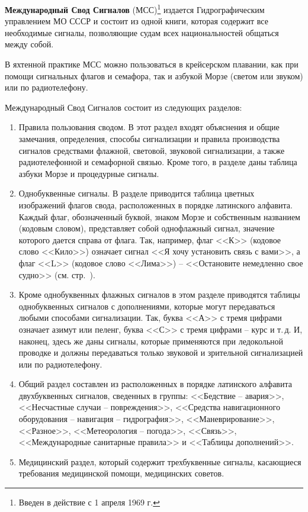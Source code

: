 \documentclass[a4paper, 12pt, twoside, final]{scrbook}
\begin{document}
\textbf{Международный Свод Сигналов} (МСС)\footnote{Введен в действие с 1 апреля 1969 г.} издается Гидрографическим управлением МО СССР и состоит из одной книги, которая содержит все необходимые сигналы, позволяющие судам всех национальностей общаться между собой.

        В яхтенной практике МСС можно пользоваться в крейсерском плавании, как при помощи сигнальных флагов и семафора, так и азбукой Морзе (светом или звуком) или по радиотелефону.

        Международный Свод Сигналов состоит из следующих разделов:

\begin{enumerate}
\item Правила пользования сводом. В этот раздел входят объяснения и общие замечания, определения, способы сигнализации и правила производства сигналов средствами флажной, световой, звуковой сигнализации, а также радиотелефонной и семафорной связью. Кроме того, в разделе даны таблица азбуки Морзе и процедурные сигналы.{\sloppy\par}
\item Однобуквенные сигналы. В разделе приводится таблица цветных изображений флагов свода, расположенных в порядке латинского алфавита. Каждый флаг, обозначенный буквой, знаком Морзе и собственным названием (кодовым словом), представляет собой однофлажный сигнал, значение которого дается справа от флага. Так, например, флаг <<К>> (кодовое слово <<Кило>>) означает сигнал <<Я хочу установить связь с вами>>, а флаг <<L>> (кодовое слово <<Лима>>) \--- <<Остановите немедленно свое судно>> (см. стр.~\pageref{app:5}).
\item Кроме однобуквенных флажных сигналов в этом разделе приводятся таблицы однобуквенных сигналов с дополнениями, которые могут передаваться любыми способами сигнализации. Так, буква <<А>> с тремя цифрами означает азимут или пеленг, буква <<С>> с тремя цифрами \--- курс и т.\,д. И, наконец, здесь же даны сигналы, которые применяются при ледокольной проводке и должны передаваться только звуковой и зрительной сигнализацией или по радиотелефону.
\item Общий раздел составлен из расположенных в порядке латинского алфавита двухбуквенных сигналов, сведенных в группы: <<Бедствие \--- авария>>, <<Несчастные случаи \--- повреждения>>, <<Средства навигационного оборудования \--- навигация \--- гидрография>>, <<Маневрирование>>, <<Разное>>, <<Метеорология \--- погода>>, <<Связь>>, <<Международные санитарные правила>> и <<Таблицы дополнений>>.
\item Медицинский раздел, который содержит трехбуквенные сигналы, касающиеся требования медицинской помощи, медицинских советов.
\end{enumerate}
\end{document}
